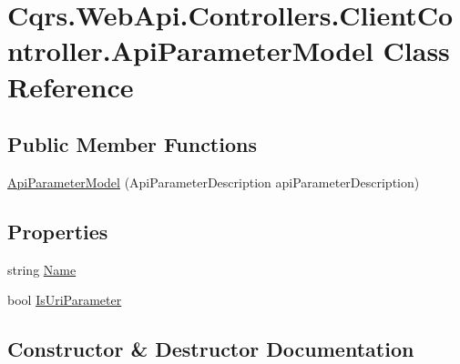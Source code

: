 \hypertarget{classCqrs_1_1WebApi_1_1Controllers_1_1ClientController_1_1ApiParameterModel}{}\section{Cqrs.\+Web\+Api.\+Controllers.\+Client\+Controller.\+Api\+Parameter\+Model Class Reference}
\label{classCqrs_1_1WebApi_1_1Controllers_1_1ClientController_1_1ApiParameterModel}
\subsection*{Public Member Functions}
\begin{DoxyCompactItemize}
\item 
\hyperlink{classCqrs_1_1WebApi_1_1Controllers_1_1ClientController_1_1ApiParameterModel_a10222cdb87160250e4722834d8ebda3b_a10222cdb87160250e4722834d8ebda3b}{Api\+Parameter\+Model} (Api\+Parameter\+Description api\+Parameter\+Description)
\end{DoxyCompactItemize}
\subsection*{Properties}
\begin{DoxyCompactItemize}
\item 
string \hyperlink{classCqrs_1_1WebApi_1_1Controllers_1_1ClientController_1_1ApiParameterModel_a0677b50dfb8a3f7b2379d1af3424c7e7_a0677b50dfb8a3f7b2379d1af3424c7e7}{Name}
\item 
bool \hyperlink{classCqrs_1_1WebApi_1_1Controllers_1_1ClientController_1_1ApiParameterModel_a2c3f5b3bab3b0a77d49339496ba7c1c5_a2c3f5b3bab3b0a77d49339496ba7c1c5}{Is\+Uri\+Parameter}
\end{DoxyCompactItemize}


\subsection{Constructor \& Destructor Documentation}
\mbox{\label{classCqrs_1_1WebApi_1_1Controllers_1_1ClientController_1_1ApiParameterModel_a10222cdb87160250e4722834d8ebda3b_a10222cdb87160250e4722834d8ebda3b}} 
